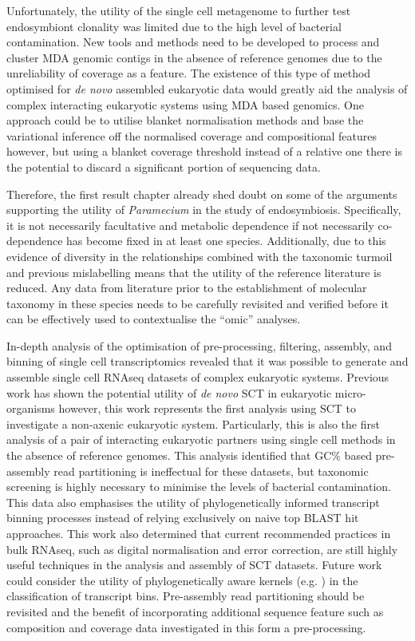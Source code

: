 Unfortunately, the utility of the single cell metagenome to further
test endosymbiont clonality was limited due to 
the high level of bacterial contamination.
New tools and methods need to be developed to process and cluster
MDA genomic contigs in the absence of reference genomes
due to the unreliability of coverage as a feature.  The existence
of this type of method optimised for \textit{de novo} assembled eukaryotic data
would greatly aid the analysis of complex interacting eukaryotic
systems using MDA based genomics.   One approach could be to utilise
blanket normalisation methods and base the variational inference
off the normalised coverage and compositional features however,
but using a blanket coverage threshold instead of a relative one
there is the potential to discard a significant portion of sequencing
data.

Therefore, the first result chapter already
shed doubt on some of the arguments supporting the utility of
\textit{Paramecium} in the study of endosymbiosis. Specifically,
it is not necessarily facultative and metabolic dependence if not
necessarily co-dependence has become fixed in at least one
species.  Additionally, due to this evidence of diversity
in the relationships combined with the taxonomic turmoil and previous
mislabelling means that the utility of the reference literature
is reduced. Any data from literature prior to the establishment
of molecular taxonomy in these species needs to be carefully
revisited and verified before it can be effectively used to
contextualise the ``omic'' analyses.


In-depth analysis of the optimisation of pre-processing,
filtering, assembly, and binning of single cell transcriptomics
revealed that it was possible to generate and assemble
single cell RNAseq datasets of complex eukaryotic
systems. Previous work has shown the potential utility
of \textit{de novo} SCT in eukaryotic micro-organisms \citep{Kolisko2014}
however, this work represents the first analysis
using SCT to investigate a non-axenic eukaryotic system.
Particularly, this is also the first analysis of a pair
of interacting eukaryotic partners using single cell methods
in the absence of reference genomes. 
This analysis identified that GC\% based pre-assembly read partitioning
is ineffectual for these datasets, but taxonomic screening
is highly necessary to minimise the levels of bacterial contamination.
This data also emphasises the utility of phylogenetically
informed transcript binning processes instead of relying
exclusively on naive top BLAST hit approaches. 
This work also determined that current recommended practices
 in bulk RNAseq, such as digital normalisation and error correction,
 are still highly useful techniques in the analysis and assembly
 of SCT datasets.
Future work could consider the utility of phylogenetically aware
kernels (e.g. \citet{Vert2002}) in the classification
of transcript bins. Pre-assembly read partitioning
should be revisited and the benefit of incorporating
additional sequence feature such as composition
and coverage data investigated in this form a pre-processing.


